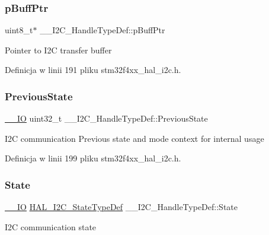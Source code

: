 \subsubsection{\texorpdfstring{p\+Buff\+Ptr}{pBuffPtr}}
{\footnotesize\ttfamily uint8\+\_\+t$\ast$ \+\_\+\+\_\+\+I2\+C\+\_\+\+Handle\+Type\+Def\+::p\+Buff\+Ptr}

Pointer to I2C transfer buffer 

Definicja w linii 191 pliku stm32f4xx\+\_\+hal\+\_\+i2c.\+h.

\mbox{\label{struct_____i2_c___handle_type_def_a028d3e824c01ccc6c9a23bb5802e3313}} 
\subsubsection{\texorpdfstring{Previous\+State}{PreviousState}}
{\footnotesize\ttfamily \hyperlink{core__sc300_8h_aec43007d9998a0a0e01faede4133d6be}{\+\_\+\+\_\+\+IO} uint32\+\_\+t \+\_\+\+\_\+\+I2\+C\+\_\+\+Handle\+Type\+Def\+::\+Previous\+State}

I2C communication Previous state and mode context for internal usage 

Definicja w linii 199 pliku stm32f4xx\+\_\+hal\+\_\+i2c.\+h.

\mbox{\label{struct_____i2_c___handle_type_def_a3421cd62d9e34c4a5ff1706916c8ae7a}} 
\subsubsection{\texorpdfstring{State}{State}}
{\footnotesize\ttfamily \hyperlink{core__sc300_8h_aec43007d9998a0a0e01faede4133d6be}{\+\_\+\+\_\+\+IO} \hyperlink{group___h_a_l__state__structure__definition_gaef355af8eab251ae2a19ee164ad81c37}{H\+A\+L\+\_\+\+I2\+C\+\_\+\+State\+Type\+Def} \+\_\+\+\_\+\+I2\+C\+\_\+\+Handle\+Type\+Def\+::\+State}

I2C communication state 


